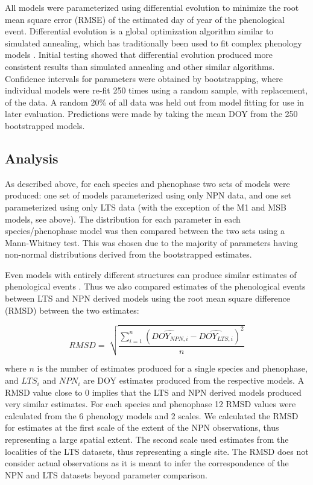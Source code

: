 \documentclass[fleqn,10pt,lineno]{wlpeerj} %
\begin{document}
All models were parameterized using differential evolution to minimize the root mean square error (RMSE) of the estimated day of year of the phenological event. Differential evolution is a global optimization algorithm similar to simulated annealing, which has traditionally been used to fit complex phenology models \citep{storn1997, chuine2000}. Initial testing showed that differential evolution produced more consistent results than simulated annealing and other similar algorithms. Confidence intervals for parameters were obtained by bootstrapping, where individual models were re-fit 250 times using a random sample, with replacement, of the data. A random 20\% of all data was held out from model fitting for use in later evaluation. Predictions were made by taking the mean DOY from the 250 bootstrapped models. 

\subsection*{Analysis}

As described above, for each species and phenophase two sets of models were produced: one set of models parameterized using only NPN data, and one set parameterized using only LTS data (with the exception of the M1 and MSB models, see above). The distribution for each parameter in each species/phenophase model was then compared between the two sets using a Mann-Whitney test. This was chosen due to the majority of parameters having non-normal distributions derived from the bootstrapped estimates. 

Even models with entirely different structures can produce similar estimates of phenological events \citep{basler2016}. Thus we also compared estimates of the phenological events between LTS and NPN derived models using the root mean square difference (RMSD) between the two estimates:

$$ RMSD = \sqrt[]{ \frac{\sum_{i=1}^{n}(\widehat{DOY_{NPN,i}} - \widehat{DOY_{LTS,i}})^{2}}{n}} $$

where $n$ is the number of estimates produced for a single species and phenophase, and $LTS_{i}$ and $NPN_{i}$ are DOY estimates produced from the respective models. A RMSD value close to 0 implies that the LTS and NPN derived models produced very similar estimates. For each species and phenophase 12 RMSD values were calculated from the 6 phenology models and 2 scales. We calculated the RMSD for estimates at the first scale of the extent of the NPN observations, thus representing a large spatial extent. The second scale used estimates from the localities of the LTS datasets, thus representing a single site. The RMSD does not consider actual observations as it is meant to infer the correspondence of the NPN and LTS datasets beyond parameter comparison. 
\end{document}
